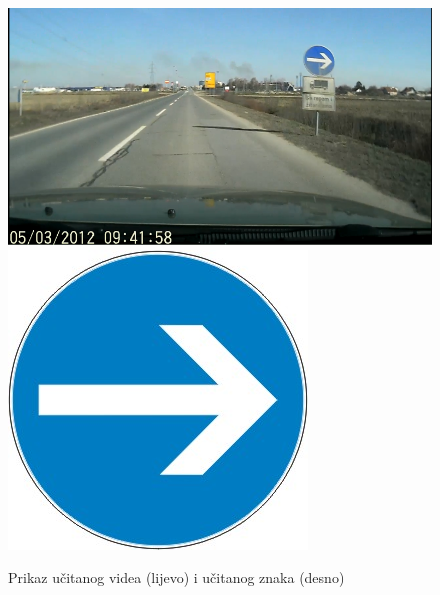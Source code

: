 \begin{figure}[!htb]
\endminipage\hfill
{}
    \includegraphics[width=\linewidth]{figures/scena.png}
\endminipage\hfill
{}
\endminipage\hfill
{}
    \includegraphics[width=\linewidth]{figures/znak.png}
\endminipage\hfill
{}
\endminipage\hfill
\caption{Prikaz učitanog videa (lijevo) i učitanog znaka (desno)}
\label{fig:lstU}
\end{figure}


